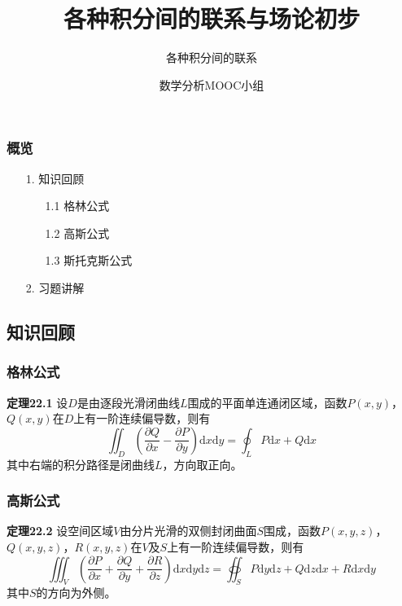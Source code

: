 \documentclass[xetex]{beamer}
\begin{document}
	\begin{frame}
		\title{各种积分间的联系与场论初步}
		\subtitle{各种积分间的联系}
		\author{数学分析MOOC小组}
		\date{  }
		\titlepage
	\end{frame}
	
	\begin{frame}
		\frametitle{概览}
		\begin{itemize}
			\item[1.] 知识回顾
				\begin{itemize}
					\item[1.1] 格林公式
					\item[1.2] 高斯公式
					\item[1.3] 斯托克斯公式
				\end{itemize}			
			\item[2.] 习题讲解
		\end{itemize}
	\end{frame}
	
	\begin{frame}
		\section{知识回顾}
	\end{frame}
	
	\begin{frame}
		\frametitle{格林公式}
		\textbf{定理22.1}
			设$D$是由逐段光滑闭曲线$L$围成的平面单连通闭区域，函数$P(x, y)$，$Q(x, y)$在$D$上有一阶连续偏导数，则有
			\begin{equation*}
				\iint_D (\frac{ \partial Q }{ \partial x } - \frac{ \partial P }{ \partial y }) \mathrm{d} x \mathrm{d} y = \oint_L P\mathrm{d} x + Q\mathrm{d} x
			\end{equation*}
			其中右端的积分路径是闭曲线$L$，方向取正向。
	\end{frame}
	
	\begin{frame}
		\frametitle{高斯公式}
		\textbf{定理22.2}
		设空间区域$V$由分片光滑的双侧封闭曲面$S$围成，函数$P(x, y, z)$，$Q(x, y, z)$，$R(x, y, z)$在$V$及$S$上有一阶连续偏导数，则有
		\begin{equation*}
			\iiint_V (\frac{ \partial P }{ \partial x } + \frac{ \partial Q }{ \partial y } + \frac{ \partial R }{ \partial z })\mathrm{d} x \mathrm{d} y \mathrm{d} z = \oiint _S P\mathrm{d} y \mathrm{d} z + Q\mathrm{d} z \mathrm{d} x + R\mathrm{d} x \mathrm{d} y
		\end{equation*}
		其中$S$的方向为外侧。
	\end{frame}
	
\end{document}
